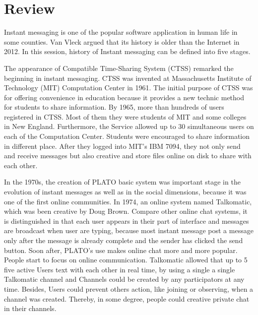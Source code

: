 \documentclass[a4paper,11pt]{article}
\begin{document}



\section{Review}
Instant messaging is one of the popular software application in human life in some counties. Van Vleck argued that its history is older than the Internet in 2012. In this session, history of Instant messaging can be defined into five stages.

The appearance of Compatible Time-Sharing System (CTSS) remarked the beginning in instant messaging. CTSS was invented at Massachusetts Institute of Technology (MIT) Computation Center in 1961. The initial purpose of CTSS was for offering convenience in education because it provides a new technic method for students to share information. By 1965, more than hundreds of users registered in CTSS. Most of them they were students of MIT and some colleges in New England. Furthermore, the Service allowed up to 30 simultaneous users on each of the Computation Center.  Students were encouraged to share information in different place. After they logged into MIT's IBM 7094, they not only send and receive messages but also creative and store files online on disk to share with each other.

In the 1970s, the creation of PLATO basic system was important stage in the evolution of instant messages as well as in the social dimensions, because it was one of the first online communities. In 1974, an online system named Talkomatic, which was been creative by Doug Brown. Compare other online chat systems, it is distinguished in that each user appears in their part of interface and messages are broadcast when user are typing, because most instant message post a message only after the message is already complete and the sender has clicked the send button. Soon after, PLATO’s use makes online chat more and more popular.  People start to focus on online communication. Talkomatic allowed that up to 5 five active Users text with each other in real time, by using a single a single Talkomatic channel and Channels could be created by any participators at any time. Besides, Users could prevent others action, like joining or observing, when a channel was created. Thereby, in some degree, people could creative private chat in their channels. 
 
\end{document}
